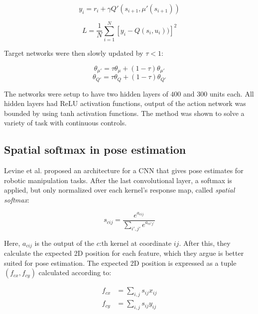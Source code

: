 \begin{equation}
    y_i = r_i + \gamma Q'(s_{i+1}, \mu'(s_{i+1}))
\end{equation}

\begin{equation}
    \mathit{L} = \frac{1}{N} \sum_{i=1}^N \left[y_i - Q(s_i, u_i)) \right]^2
\end{equation}

Target networks were then slowly updated by $\tau < 1$:

\begin{equation}
    \theta_{\mu'} = \tau \theta_{\mu} + (1 - \tau) \theta_{\mu'}
\end{equation}
\begin{equation}
    \theta_{Q'} = \tau \theta_{Q} + (1 - \tau) \theta_{Q'}
\end{equation}

The networks were setup to have two hidden layers of $400$ and $300$ units
each.  All hidden layers had ReLU activation functions, output of the action
network was bounded by using tanh activation functions. The method was shown to
solve a variety of task with continuous controls.

\subsection{Spatial softmax in pose estimation}

Levine et al. \cite{levine2016end} proposed an architecture for a CNN that
gives pose estimates for robotic manipulation tasks. After the last
convolutional layer, a softmax is applied, but only normalized over each
kernel's response map, called \textit{spatial softmax}:

\begin{equation}
    s_{cij} = \frac{e^{a_{cij}}}{\sum_{i',j'} e^{a_{ci'j'}}}
\end{equation}

Here, $a_{cij}$ is the output of the $c$:th kernel at coordinate $ij$. After
this, they calculate the expected 2D position for each feature, which they
argue is better suited for pose estimation. The expected 2D position is
expressed as a tuple $(f_{cx}, f_{cy})$ calculated according to:

\begin{align}
    f_{cx} &= \sum_{i,j} s_{ij} x_{ij} \\
    f_{cy} &= \sum_{i,j} s_{ij} y_{ij}
\end{align}

